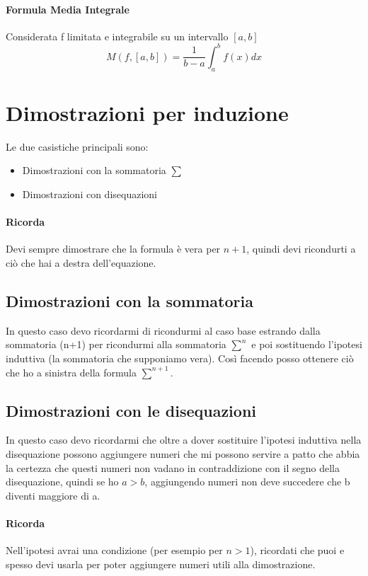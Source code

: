 \documentclass[12pt, a4paper]{article}
\begin{document}
\paragraph*{Formula Media Integrale}
Considerata f limitata e integrabile su un intervallo $[a,b]$
\begin{equation*}
	M(f,[a,b])=\frac{1}{b-a}\int_a^b f(x)dx
\end{equation*}

\section*{Dimostrazioni per induzione}
Le due casistiche principali sono:
\begin{itemize}
	\item Dimostrazioni con la sommatoria $\sum$
	\item Dimostrazioni con disequazioni
\end{itemize}
\paragraph*{Ricorda} Devi sempre dimostrare che la formula è vera per $n+1$, quindi devi ricondurti a
ciò che hai a destra dell'equazione.

\subsection*{Dimostrazioni con la sommatoria}
In questo caso devo ricordarmi di ricondurmi al caso base estrando dalla sommatoria (n+1)
per ricondurmi alla sommatoria $\sum^n$ e poi sostituendo l'ipotesi induttiva 
(la sommatoria che supponiamo vera). Così facendo posso ottenere ciò che ho a sinistra della
formula $\sum^{n+1}$.
\subsection*{Dimostrazioni con le disequazioni}
In questo caso devo ricordarmi che oltre a dover sostituire l'ipotesi induttiva nella disequazione
possono aggiungere numeri che mi possono servire a patto che abbia la certezza che questi numeri non
vadano in contraddizione con il segno della disequazione, quindi se ho $a>b$, aggiungendo numeri non deve succedere
che b diventi maggiore di a.
\paragraph*{Ricorda} Nell'ipotesi avrai una condizione (per esempio per $n>1$), ricordati che puoi e spesso
devi usarla per poter aggiungere numeri utili alla dimostrazione. 
\end{document}
